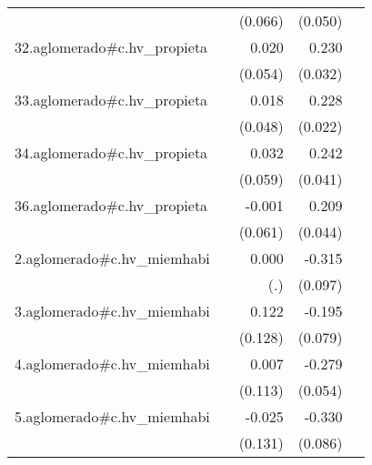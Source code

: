{\begin{longtable}{l*{4}{D{.}{.}{-1}}}
            &                     &     (0.066)         &     (0.050)         &                     \\
\addlinespace
32.aglomerado#c.hv\_propieta&                     &       0.020         &       0.230\sym{***}&                     \\
            &                     &     (0.054)         &     (0.032)         &                     \\
\addlinespace
33.aglomerado#c.hv\_propieta&                     &       0.018         &       0.228\sym{***}&                     \\
            &                     &     (0.048)         &     (0.022)         &                     \\
\addlinespace
34.aglomerado#c.hv\_propieta&                     &       0.032         &       0.242\sym{***}&                     \\
            &                     &     (0.059)         &     (0.041)         &                     \\
\addlinespace
36.aglomerado#c.hv\_propieta&                     &      -0.001         &       0.209\sym{***}&                     \\
            &                     &     (0.061)         &     (0.044)         &                     \\
\addlinespace
2.aglomerado#c.hv\_miemhabi&                     &       0.000         &      -0.315\sym{**} &                     \\
            &                     &         (.)         &     (0.097)         &                     \\
\addlinespace
3.aglomerado#c.hv\_miemhabi&                     &       0.122         &      -0.195\sym{*}  &                     \\
            &                     &     (0.128)         &     (0.079)         &                     \\
\addlinespace
4.aglomerado#c.hv\_miemhabi&                     &       0.007         &      -0.279\sym{***}&                     \\
            &                     &     (0.113)         &     (0.054)         &                     \\
\addlinespace
5.aglomerado#c.hv\_miemhabi&                     &      -0.025         &      -0.330\sym{***}&                     \\
            &                     &     (0.131)         &     (0.086)         &                     \\

\end{longtable}}
